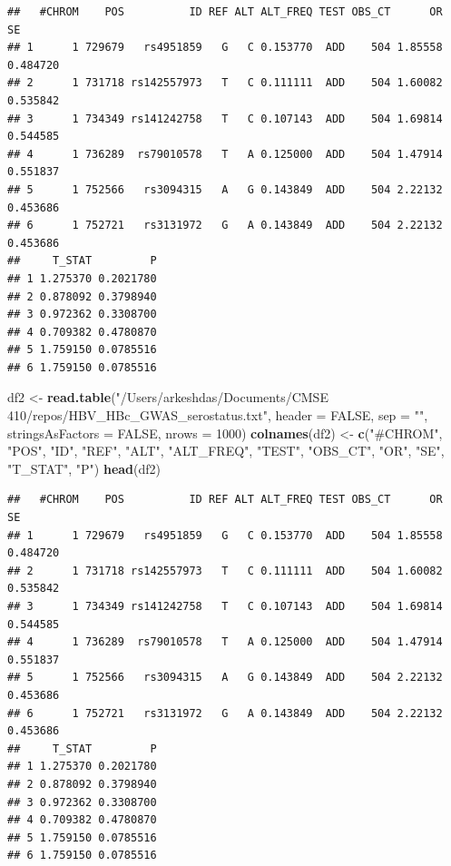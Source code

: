 \documentclass[
  12pt,
]{article}
\newenvironment{Shaded}{\begin{snugshade}}{\end{snugshade}}
\newcommand{\AttributeTok}[1]{\textcolor[rgb]{0.13,0.29,0.53}{#1}}
\newcommand{\ConstantTok}[1]{\textcolor[rgb]{0.56,0.35,0.01}{#1}}
\newcommand{\DecValTok}[1]{\textcolor[rgb]{0.00,0.00,0.81}{#1}}
\newcommand{\FunctionTok}[1]{\textcolor[rgb]{0.13,0.29,0.53}{\textbf{#1}}}
\newcommand{\NormalTok}[1]{#1}
\newcommand{\OtherTok}[1]{\textcolor[rgb]{0.56,0.35,0.01}{#1}}
\newcommand{\StringTok}[1]{\textcolor[rgb]{0.31,0.60,0.02}{#1}}
\begin{document}
\begin{verbatim}
##   #CHROM    POS          ID REF ALT ALT_FREQ TEST OBS_CT      OR       SE
## 1      1 729679   rs4951859   G   C 0.153770  ADD    504 1.85558 0.484720
## 2      1 731718 rs142557973   T   C 0.111111  ADD    504 1.60082 0.535842
## 3      1 734349 rs141242758   T   C 0.107143  ADD    504 1.69814 0.544585
## 4      1 736289  rs79010578   T   A 0.125000  ADD    504 1.47914 0.551837
## 5      1 752566   rs3094315   A   G 0.143849  ADD    504 2.22132 0.453686
## 6      1 752721   rs3131972   G   A 0.143849  ADD    504 2.22132 0.453686
##     T_STAT         P
## 1 1.275370 0.2021780
## 2 0.878092 0.3798940
## 3 0.972362 0.3308700
## 4 0.709382 0.4780870
## 5 1.759150 0.0785516
## 6 1.759150 0.0785516
\end{verbatim}

\begin{Shaded}
\begin{Highlighting}[]
\NormalTok{df2 }\OtherTok{\textless{}{-}} \FunctionTok{read.table}\NormalTok{(}\StringTok{"/Users/arkeshdas/Documents/CMSE 410/repos/HBV\_HBc\_GWAS\_serostatus.txt"}\NormalTok{, }\AttributeTok{header =} \ConstantTok{FALSE}\NormalTok{, }\AttributeTok{sep =} \StringTok{""}\NormalTok{, }\AttributeTok{stringsAsFactors =} \ConstantTok{FALSE}\NormalTok{, }\AttributeTok{nrows =} \DecValTok{1000}\NormalTok{)}
\FunctionTok{colnames}\NormalTok{(df2) }\OtherTok{\textless{}{-}} \FunctionTok{c}\NormalTok{(}\StringTok{"\#CHROM"}\NormalTok{, }\StringTok{"POS"}\NormalTok{, }\StringTok{"ID"}\NormalTok{, }\StringTok{"REF"}\NormalTok{, }\StringTok{"ALT"}\NormalTok{, }\StringTok{"ALT\_FREQ"}\NormalTok{, }\StringTok{"TEST"}\NormalTok{, }\StringTok{"OBS\_CT"}\NormalTok{, }\StringTok{"OR"}\NormalTok{, }\StringTok{"SE"}\NormalTok{, }\StringTok{"T\_STAT"}\NormalTok{, }\StringTok{"P"}\NormalTok{)}
\FunctionTok{head}\NormalTok{(df2)}
\end{Highlighting}
\end{Shaded}

\begin{verbatim}
##   #CHROM    POS          ID REF ALT ALT_FREQ TEST OBS_CT      OR       SE
## 1      1 729679   rs4951859   G   C 0.153770  ADD    504 1.85558 0.484720
## 2      1 731718 rs142557973   T   C 0.111111  ADD    504 1.60082 0.535842
## 3      1 734349 rs141242758   T   C 0.107143  ADD    504 1.69814 0.544585
## 4      1 736289  rs79010578   T   A 0.125000  ADD    504 1.47914 0.551837
## 5      1 752566   rs3094315   A   G 0.143849  ADD    504 2.22132 0.453686
## 6      1 752721   rs3131972   G   A 0.143849  ADD    504 2.22132 0.453686
##     T_STAT         P
## 1 1.275370 0.2021780
## 2 0.878092 0.3798940
## 3 0.972362 0.3308700
## 4 0.709382 0.4780870
## 5 1.759150 0.0785516
## 6 1.759150 0.0785516
\end{verbatim}
\end{document}
